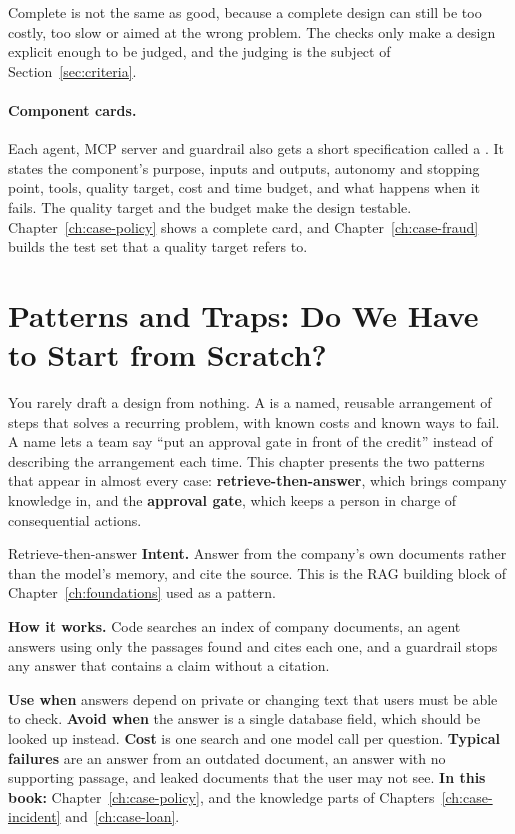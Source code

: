 Complete is not the same as good, because a complete design can still be too costly, too slow or aimed at the wrong problem. The checks only make a design explicit enough to be judged, and the judging is the subject of Section~\ref{sec:criteria}.

\paragraph{Component cards.} Each agent, MCP server and guardrail also gets a short specification called a . It states the component's purpose, inputs and outputs, autonomy and stopping point, tools, quality target, cost and time budget, and what happens when it fails. The quality target and the budget make the design testable. Chapter~\ref{ch:case-policy} shows a complete card, and Chapter~\ref{ch:case-fraud} builds the test set that a quality target refers to.

\section{Patterns and Traps: Do We Have to Start from Scratch?}
\label{sec:patterns}

You rarely draft a design from nothing. A  is a named, reusable arrangement of steps that solves a recurring problem, with known costs and known ways to fail. A name lets a team say ``put an approval gate in front of the credit'' instead of describing the arrangement each time. This chapter presents the two patterns that appear in almost every case: \textbf{retrieve-then-answer}, which brings company knowledge in, and the \textbf{approval gate}, which keeps a person in charge of consequential actions.

\begin{patterncard}{Retrieve-then-answer}
\textbf{Intent.} Answer from the company's own documents rather than the model's memory, and cite the source. This is the RAG building block of Chapter~\ref{ch:foundations} used as a pattern.\par\smallskip
\textbf{How it works.} Code searches an index of company documents, an agent answers using only the passages found and cites each one, and a guardrail stops any answer that contains a claim without a citation.\par\smallskip
\textbf{Use when} answers depend on private or changing text that users must be able to check. \textbf{Avoid when} the answer is a single database field, which should be looked up instead. \textbf{Cost} is one search and one model call per question. \textbf{Typical failures} are an answer from an outdated document, an answer with no supporting passage, and leaked documents that the user may not see. \textbf{In this book:} Chapter~\ref{ch:case-policy}, and the knowledge parts of Chapters~\ref{ch:case-incident} and~\ref{ch:case-loan}.
\end{patterncard}

